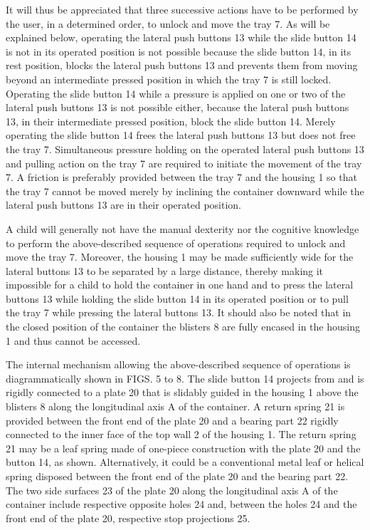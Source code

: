 \documentclass[11pt,a4paper]{article}
\begin{document}
It will thus be appreciated that three successive actions have to be performed by the user, in a determined order, to unlock and move the tray 7. As will be explained below, operating the lateral push buttons 13 while the slide button 14 is not in its operated position is not possible because the slide button 14, in its rest position, blocks the lateral push buttons 13 and prevents them from moving beyond an intermediate pressed position in which the tray 7 is still locked. Operating the slide button 14 while a pressure is applied on one or two of the lateral push buttons 13 is not possible either, because the lateral push buttons 13, in their intermediate pressed position, block the slide button 14. Merely operating the slide button 14 frees the lateral push buttons 13 but does not free the tray 7. Simultaneous pressure holding on the operated lateral push buttons 13 and pulling action on the tray 7 are required to initiate the movement of the tray 7. A friction is preferably provided between the tray 7 and the housing 1 so that the tray 7 cannot be moved merely by inclining the container downward while the lateral push buttons 13 are in their operated position.

A child will generally not have the manual dexterity nor the cognitive knowledge to perform the above-described sequence of operations required to unlock and move the tray 7. Moreover, the housing 1 may be made sufficiently wide for the lateral buttons 13 to be separated by a large distance, thereby making it impossible for a child to hold the container in one hand and to press the lateral buttons 13 while holding the slide button 14 in its operated position or to pull the tray 7 while pressing the lateral buttons 13. It should also be noted that in the closed position of the container the blisters 8 are fully encased in the housing 1 and thus cannot be accessed.

The internal mechanism allowing the above-described sequence of operations is diagrammatically shown in FIGS. 5 to 8. The slide button 14 projects from and is rigidly connected to a plate 20 that is slidably guided in the housing 1 above the blisters 8 along the longitudinal axis A of the container. A return spring 21 is provided between the front end of the plate 20 and a bearing part 22 rigidly connected to the inner face of the top wall 2 of the housing 1. The return spring 21 may be a leaf spring made of one-piece construction with the plate 20 and the button 14, as shown. Alternatively, it could be a conventional metal leaf or helical spring disposed between the front end of the plate 20 and the bearing part 22. The two side surfaces 23 of the plate 20 along the longitudinal axis A of the container include respective opposite holes 24 and, between the holes 24 and the front end of the plate 20, respective stop projections 25.
\end{document}
